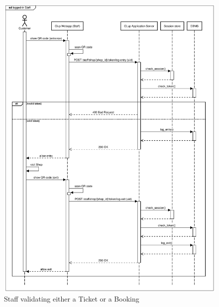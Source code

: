 \begin{figure}[H]
    \centering
    \includegraphics[width=1\textwidth]{Images/runtime_tokenvalidate.pdf}
    \caption{Staff validating either a Ticket or a Booking}
\end{figure}
